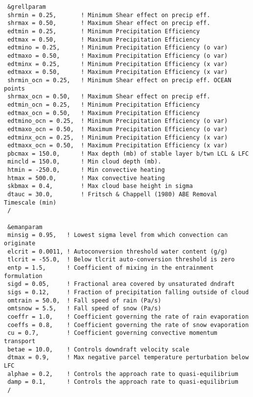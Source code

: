 {\footnotesize
\begin{Verbatim}
 &grellparam
 shrmin = 0.25,       ! Minimum Shear effect on precip eff.
 shrmax = 0.50,       ! Maximum Shear effect on precip eff.
 edtmin = 0.25,       ! Minimum Precipitation Efficiency
 edtmax = 0.50,       ! Maximum Precipitation Efficiency
 edtmino = 0.25,      ! Minimum Precipitation Efficiency (o var)
 edtmaxo = 0.50,      ! Maximum Precipitation Efficiency (o var)
 edtminx = 0.25,      ! Minimum Precipitation Efficiency (x var)
 edtmaxx = 0.50,      ! Maximum Precipitation Efficiency (x var)
 shrmin_ocn = 0.25,   ! Minimum Shear effect on precip eff. OCEAN points
 shrmax_ocn = 0.50,   ! Maximum Shear effect on precip eff.
 edtmin_ocn = 0.25,   ! Minimum Precipitation Efficiency
 edtmax_ocn = 0.50,   ! Maximum Precipitation Efficiency
 edtmino_ocn = 0.25,  ! Minimum Precipitation Efficiency (o var)
 edtmaxo_ocn = 0.50,  ! Maximum Precipitation Efficiency (o var)
 edtminx_ocn = 0.25,  ! Minimum Precipitation Efficiency (x var)
 edtmaxx_ocn = 0.50,  ! Maximum Precipitation Efficiency (x var)
 pbcmax = 150.0,      ! Max depth (mb) of stable layer b/twn LCL & LFC
 mincld = 150.0,      ! Min cloud depth (mb).
 htmin = -250.0,      ! Min convective heating
 htmax = 500.0,       ! Max convective heating
 skbmax = 0.4,        ! Max cloud base height in sigma
 dtauc = 30.0,        ! Fritsch & Chappell (1980) ABE Removal Timescale (min)
 /

 &emanparam
 minsig = 0.95,   ! Lowest sigma level from which convection can originate
 elcrit = 0.0011, ! Autoconversion threshold water content (g/g)
 tlcrit = -55.0,  ! Below tlcrit auto-conversion threshold is zero
 entp = 1.5,      ! Coefficient of mixing in the entrainment formulation
 sigd = 0.05,     ! Fractional area covered by unsaturated dndraft
 sigs = 0.12,     ! Fraction of precipitation falling outside of cloud
 omtrain = 50.0,  ! Fall speed of rain (Pa/s)
 omtsnow = 5.5,   ! Fall speed of snow (Pa/s)
 coeffr = 1.0,    ! Coefficient governing the rate of rain evaporation
 coeffs = 0.8,    ! Coefficient governing the rate of snow evaporation
 cu = 0.7,        ! Coefficient governing convective momentum transport
 betae = 10.0,    ! Controls downdraft velocity scale
 dtmax = 0.9,     ! Max negative parcel temperature perturbation below LFC
 alphae = 0.2,    ! Controls the approach rate to quasi-equilibrium
 damp = 0.1,      ! Controls the approach rate to quasi-equilibrium
 /


\end{Verbatim}}
